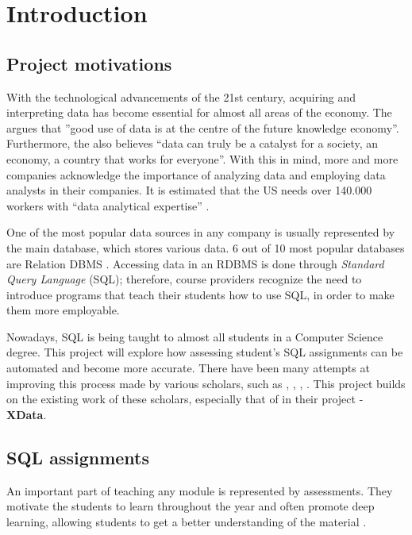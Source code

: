 \chapter{Introduction} \label{ch:introduction}
\section{Project motivations}
With the technological advancements of the 21st century, acquiring and interpreting
data has become essential for almost all areas of the economy. The \cite{ec:big_data} argues that ''good use of data is at
the centre of the future knowledge economy''.
Furthermore, the \cite{gov:big_data} also believes ``data can truly be a catalyst for a society, an economy, a country that works for everyone''. With this in mind, more and more companies acknowledge the importance of analyzing data and employing data analysts in their companies. It is estimated that the US needs over 140.000 workers with ``data analytical expertise'' \citep{Lohr2012}.

One of the most popular data sources in any company is usually represented by the main database, which stores various data. 6 out of 10 most popular databases are Relation DBMS \citep{db_engine:statistics}.
Accessing data in an RDBMS is done through \textit{Standard Query Language}
(SQL); therefore, course providers recognize the need to introduce programs that teach their students how to use SQL, in order to make them more employable.

Nowadays, SQL is being taught to almost all students in a Computer Science
degree. This project will explore how assessing student's SQL
assignments can be automated and become more accurate. There have been many attempts at improving this process made by various scholars, such as \cite{literature:activesql}, \cite{literature:assesql},
\cite{literature:sqlify}, \cite{literature:xdata}. This project builds on the existing work of these scholars, especially that of \cite{literature:xdata} in their project - \textbf{XData}.

\section{SQL assignments} \label{ch:introduction:assignments}

An important part of teaching any module is represented by assessments. They motivate the students to learn throughout the year and often promote deep learning, allowing students to get a better understanding of the material \citep{literature:assement}.

